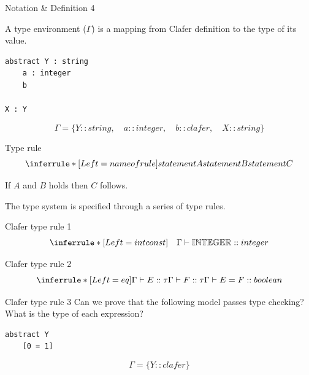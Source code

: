 \documentclass[table,15pt,t]{beamer}
\begin{document}
\begin{frame}[fragile,c]{Notation \& Definition 4}

\begin{definition}
A type environment ($\Gamma$) is a mapping from Clafer definition to the type of its value.
\end{definition}

\vfill \begin{lstlisting}
abstract Y : string
    a : integer
    b

X : Y
\end{lstlisting}

\begin{equation*}
\Gamma = \{ Y::string,\quad a::integer,\quad b::clafer,\quad X::string \}
\end{equation*}
\end{frame}

\begin{frame}[fragile,c]{Type rule}
\begin{equation*}
\inferrule* [Left=name of rule] {statement A \\ statement B} {statement C}
\end{equation*}

\vfill If $A$ and $B$ holds then $C$ follows.

\vfill The type system is specified through a series of type rules.
\end{frame}

\begin{frame}[fragile,c]{Clafer type rule 1}
\begin{equation*}
\inferrule* [Left=intconst] {\quad}{\Gamma\vdash\mathbb{INTEGER}::integer}
\end{equation*}
\end{frame}

\begin{frame}[fragile,c]{Clafer type rule 2}
\begin{equation*}
\inferrule* [Left=eq] {\Gamma\vdash E::\tau \\ \Gamma\vdash F::\tau}{\Gamma\vdash E = F::boolean}
\end{equation*}
\end{frame}

\begin{frame}[fragile,c]{Clafer type rule 3}
Can we prove that the following model passes type checking?
What is the type of each expression?

\begin{lstlisting}
abstract Y
    [0 = 1]
\end{lstlisting}

\begin{equation*}
\Gamma = \{Y::clafer\}
\end{equation*}
\end{frame}
\end{document}
